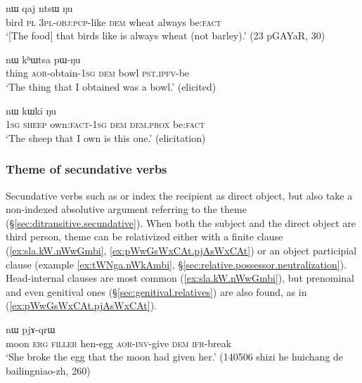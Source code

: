   \begin{exe}
\ex \label{ex:pGa.ra.nWkArga}
 nɯ qaj ntsɯ ŋu   \\
bird \textsc{pl} \textsc{3pl}-\textsc{obj}:\textsc{pcp}-like \textsc{dem} wheat always be:\textsc{fact} \\
  \glt `[The food] that birds like is always wheat (not barley).' (23 pGAYaR, 30)
   \end{exe} 
   
  \begin{exe}
\ex \label{ex:pWBJata.nW}
 nɯ kʰɯtsa pɯ-ŋu \\
thing \textsc{aor}-obtain-\textsc{1sg} \textsc{dem} bowl \textsc{pst}.\textsc{ipfv}-be \\
\glt `The thing that I obtained was a bowl.' (elicited)
   \end{exe} 
   
  \begin{exe}
\ex \label{ex:aroa.nW}
 nɯ kɯki ŋu  \\
\textsc{1sg} \textsc{sheep} own:\textsc{fact}-\textsc{1sg} \textsc{dem} \textsc{dem}.\textsc{prox} be:\textsc{fact} \\
  \glt `The sheep that I own is this one.' (elicitation)
   \end{exe} 
   
 \subsubsection{Theme of secundative verbs}  \label{sec:secundative.theme.relativization}
Secundative verbs such as  or  index the recipient as direct object, but also take a non-indexed absolutive argument referring to the theme (§\ref{sec:ditransitive.secundative}). When both the subject and the direct object are third person, theme can be relativized either with a finite clause (\ref{ex:sla.kW.nWwGmbi}, \ref{ex:pWwGsWxCAt.pjAsWxCAt}) or an object participial clause (example \ref{ex:tWNga.nWkAmbi}, §\ref{sec:relative.possessor.neutralization}).  Head-internal clauses are most common (\ref{ex:sla.kW.nWwGmbi}), but prenominal and even genitival ones (§\ref{sec:genitival.relatives}) are also found, as in (\ref{ex:pWwGsWxCAt.pjAsWxCAt}).
 
\begin{exe}
\ex \label{ex:sla.kW.nWwGmbi}
 nɯ pjɤ-qrɯ \\
moon \textsc{erg} \textsc{filler} hen-egg \textsc{aor}-\textsc{inv}-give \textsc{dem} \textsc{ifr}-break \\
\glt `She broke the egg that the moon had given her.' (140506 shizi he huichang de bailingniao-zh, 260)
\end{exe} 
 
